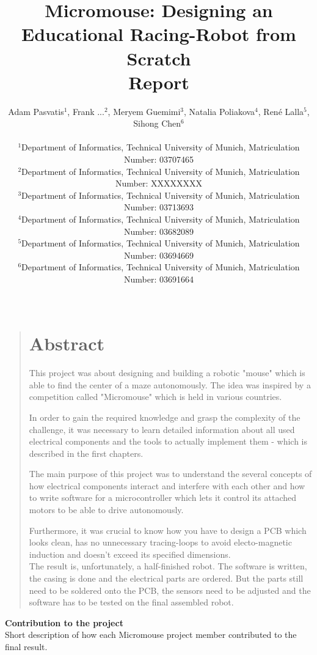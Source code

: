 \documentclass[12pt]{article}
\title{Micromouse: Designing an Educational Racing-Robot from Scratch \\Report}
\author
{Adam Pasvatis$^{1}$, Frank ...$^{2}$, Meryem Guemimi$^{3}$, Natalia Poliakova$^{4}$, René Lalla$^{5}$, Sihong Chen$^{6}$\\
\\
\normalsize{$^{1}$Department of Informatics, Technical University of Munich, Matriculation Number: 03707465}\\
\normalsize{$^{2}$Department of Informatics, Technical University of Munich, Matriculation Number: XXXXXXXX}\\
\normalsize{$^{3}$Department of Informatics, Technical University of Munich, Matriculation Number: 03713693}\\
\normalsize{$^{4}$Department of Informatics, Technical University of Munich, Matriculation Number: 03682089}\\
\normalsize{$^{5}$Department of Informatics, Technical University of Munich, Matriculation Number: 03694669}\\
\normalsize{$^{6}$Department of Informatics, Technical University of Munich, Matriculation Number: 03691664}\\
\\
}
\date{}
\newenvironment{sciabstract}{%
\begin{quote} \bf}
{\end{quote}}
\begin{document}

\baselineskip24pt


\maketitle

\newpage

\begin{sciabstract}
  \section*{Abstract}
    This project was about designing and building a robotic "mouse" which is able to find the center of a maze autonomously. The idea was inspired by a competition called "Micromouse" which is held in various countries.

    In order to gain the required knowledge and grasp the complexity of the challenge, it was necessary to learn detailed information about all used electrical components and the tools to actually implement them - which is described in the first chapters.

    The main purpose of this project was to understand the several concepts of how electrical components interact and interfere with each other and how to write software for a microcontroller which lets it control its attached motors to be able to drive autonomously.

    Furthermore, it was crucial to know how you have to design a PCB which looks clean, has no unnecessary tracing-loops to avoid electo-magnetic induction and doesn't exceed its specified dimensions.\\

    \noindent
    The result is, unfortunately, a half-finished robot. The software is written, the casing is done and the electrical parts are ordered. But the parts still need to be soldered onto the PCB, the sensors need to be adjusted and the software has to be tested on the final assembled robot.\\

\end{sciabstract}

\newpage

\Large \textbf{Contribution to the project}\\

\normalsize Short description of how each Micromouse project member contributed to the final result.
\end{document}
